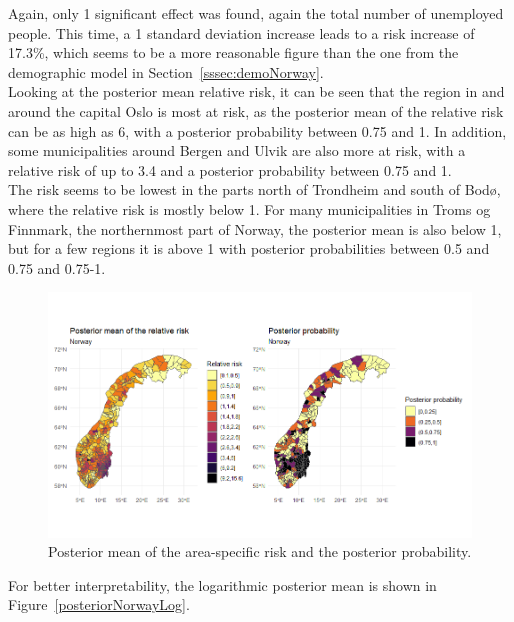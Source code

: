 Again, only 1 significant effect was found, again the total number of unemployed people. This time, a 1 standard deviation increase leads to a risk increase of 17.3\%, which seems to be a more reasonable figure than the one from the demographic model in Section~\ref{sssec:demoNorway}. \\
Looking at the posterior mean relative risk, it can be seen that the region in and around the capital Oslo is most at risk, as the posterior mean of the relative risk can be as high as 6, with a posterior probability between 0.75 and 1. In addition, some municipalities around Bergen and Ulvik are also more at risk, with a relative risk of up to 3.4 and a posterior probability between 0.75 and 1. \\
The risk seems to be lowest in the parts north of Trondheim and south of Bodø, where the relative risk is mostly below 1. For many municipalities in Troms og Finnmark, the northernmost part of Norway, the posterior mean is also below 1, but for a few regions it is above 1 with posterior probabilities between 0.5 and 0.75 and 0.75-1.
\begin{figure}[H]
    \centering
    \includegraphics[width = \textwidth]{posterior_norway.png}
    \caption{Posterior mean of the area-specific risk and the posterior probability.}
    \label{posteriorNorway}
\end{figure}
%     
For better interpretability, the logarithmic posterior mean is shown in Figure~\ref{posteriorNorwayLog}.

